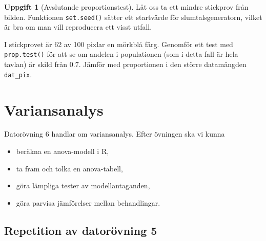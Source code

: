 \documentclass[
]{book}
\newenvironment{Shaded}{\begin{snugshade}}{\end{snugshade}}
\newcommand{\AttributeTok}[1]{\textcolor[rgb]{0.13,0.29,0.53}{#1}}
\newcommand{\DecValTok}[1]{\textcolor[rgb]{0.00,0.00,0.81}{#1}}
\newcommand{\FunctionTok}[1]{\textcolor[rgb]{0.13,0.29,0.53}{\textbf{#1}}}
\newcommand{\NormalTok}[1]{#1}
\newcommand{\OtherTok}[1]{\textcolor[rgb]{0.56,0.35,0.01}{#1}}
\newcommand{\SpecialCharTok}[1]{\textcolor[rgb]{0.81,0.36,0.00}{\textbf{#1}}}
\theoremstyle{definition}
\theoremstyle{definition}
\theoremstyle{definition}
\newtheorem{exercise}{Uppgift}[chapter]
\theoremstyle{definition}
\theoremstyle{remark}
\begin{document}
\begin{exercise}[Avslutande proportionstest]
Låt oss ta ett mindre stickprov från bilden. Funktionen \texttt{set.seed()} sätter ett startvärde för slumtalsgeneratorn, vilket är bra om man vill reproducera ett visst utfall.

\begin{Shaded}
\end{Shaded}

I stickprovet är 62 av 100 pixlar en mörkblå färg. Genomför ett test med \texttt{prop.test()} för att se om andelen i populationen (som i detta fall är hela tavlan) är skild från 0.7. Jämför med proportionen i den större datamängden \texttt{dat\_pix}.
\end{exercise}

\chapter{Variansanalys}\label{variansanalys}

Datorövning 6 handlar om variansanalys. Efter övningen ska vi kunna

\begin{itemize}
\item
  beräkna en anova-modell i R,
\item
  ta fram och tolka en anova-tabell,
\item
  göra lämpliga tester av modellantaganden,
\item
  göra parvisa jämförelser mellan behandlingar.
\end{itemize}

\section{Repetition av datorövning 5}\label{repetition-av-datoruxf6vning-5}
\end{document}
